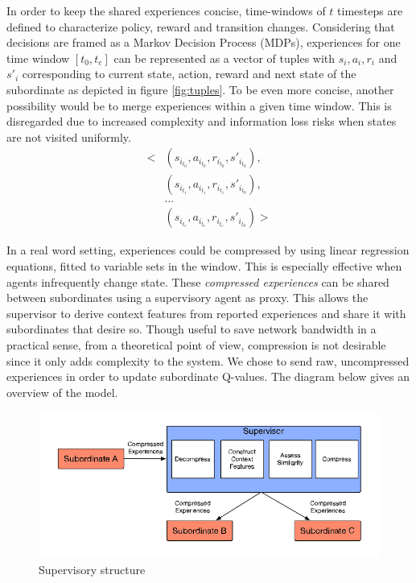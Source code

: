 \documentclass[letterpaper]{article}
\begin{document}
In order to keep the shared experiences concise, time-windows of $t$ timesteps are defined to characterize policy, reward and transition changes. Considering that decisions are framed as a Markov Decision Process (MDPs), experiences for one time window $[t_{0}, t_{e}]$ can be represented as a vector of tuples with $s_i, a_i, r_i$ and $s'_i$ corresponding to current state, action, reward and next state of the subordinate as depicted in figure \ref{fig:tuples}. To be even more concise, another possibility would be to merge experiences within a given time window. This is disregarded due to increased complexity and information loss risks when states are not visited uniformly.
\vspace{\baselineskip}
\begin{align*}
 \biggl<
  & (s_{i_{t_0}},a_{i_{t_0}},r_{i_{t_0}},s'_{i_{t_0}}), \\
  & (s_{i_{t_1}},a_{i_{t_1}},r_{i_{t_1}},s'_{i_{t_0}}), \\
  & \hdots                                              \\
  & (s_{i_{t_e}},a_{i_{t_e}},r_{i_{t_e}},s'_{i_{t_0}})
 \biggr>
\end{align*}
\begingroup\vspace*{-\baselineskip}
 \label{fig:tuples}
\vspace*{\baselineskip}\endgroup

In a real word setting, experiences could be compressed by using linear regression equations, fitted to variable sets in the window. This is especially effective when agents infrequently change state. These \textit{compressed experiences} can be shared between subordinates using a supervisory agent as proxy. This allows the supervisor to derive context features from reported experiences and share it with subordinates that desire so. Though useful to save network bandwidth in a practical sense, from a theoretical point of view, compression is not desirable since it only adds complexity to the system. We chose to send raw, uncompressed experiences in order to update subordinate Q-values. The diagram below gives an overview of the model.
\begin{figure}[H]
 \begin{center}
  \includegraphics[width=\linewidth]{figures/diagram}
  \caption{Supervisory structure \citep{garant2015accelerating}}
  \label{fig:diagram}
 \end{center}
\end{figure}
\end{document}
